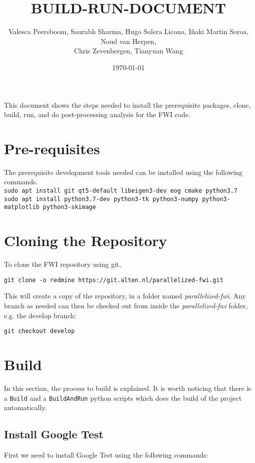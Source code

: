 \documentclass[10pt]{article}
\title{BUILD-RUN-DOCUMENT}
\author{Valesca Peereboom, Saurabh Sharma, Hugo Solera Licona, I\~{n}aki Martin Soroa, Noud van Herpen, \\
Chris Zevenbergen, Tianyuan Wang}
\date{\today}
\begin{document}
\maketitle
\noindent This document shows the steps needed to install the prerequisite packages, clone, build, run, and do post-processing analysis for the FWI code. 

\section{Pre-requisites}
The prerequisite development tools needed can be installed using the following commands.\\

\noindent \texttt{sudo apt install git qt5-default libeigen3-dev eog cmake python3.7}\\
\texttt{sudo apt install python3.7-dev python3-tk python3-numpy python3-matplotlib python3-skimage}  


\section{Cloning the Repository}
\noindent To clone the FWI repository using git, 
\newline

\texttt{git clone -o redmine https://git.alten.nl/parallelized-fwi.git} 
\newline

This will create a copy of the repository, in a folder named \textit{parallelized-fwi}. Any branch as needed can then be checked out from inside the \textit{parallelized-fwi} folder, e.g. the develop branch: 
\newline

\texttt{git checkout develop}

\section{Build}
In this section, the process to build is explained. It is worth noticing that there is a \texttt{Build} and a \texttt{BuildAndRun} python scripts which does the build of the project automatically. 


\subsection{Install Google Test}
First we need to install Google Test using the following commands:
\newline
\end{document}
